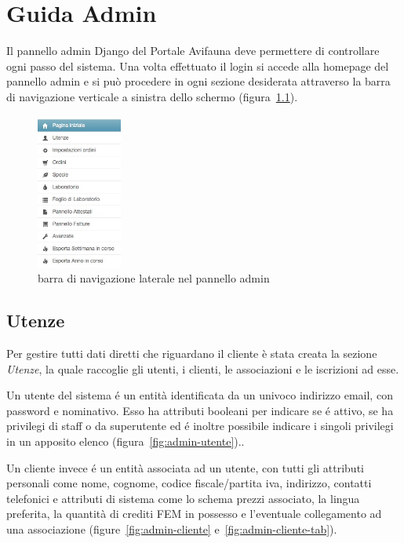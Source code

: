\chapter{Guida Admin}
\label{app:admin}

Il pannello admin Django del Portale Avifauna deve permettere di controllare ogni passo del sistema. Una volta effettuato il login si accede alla homepage del pannello admin e si può procedere in ogni sezione desiderata attraverso la barra di navigazione verticale a sinistra dello schermo (figura~\ref{fig:admin-navbar}).

\begin{figure}
 \centering
 \includegraphics[width=0.25\textwidth]{images/admin-navbar}
 \caption{barra di navigazione laterale nel pannello admin}
 \label{fig:admin-navbar}
\end{figure}

\section*{Utenze}
Per gestire tutti dati diretti che riguardano il cliente è stata creata la sezione \emph{Utenze}, la quale raccoglie gli utenti, i clienti, le associazioni e le iscrizioni ad esse.

Un \textsf{utente} del sistema é un entità identificata da un univoco indirizzo email, con password e nominativo. Esso ha attributi booleani per indicare se é attivo, se ha privilegi di staff o da superutente ed é inoltre possibile indicare i singoli privilegi in un apposito elenco (figura~\ref{fig:admin-utente})..

Un \textsf{cliente} invece é un entità associata ad un utente, con tutti gli attributi personali come nome, cognome, codice fiscale/partita iva, indirizzo, contatti telefonici e attributi di sistema come lo schema prezzi associato, la lingua preferita, la quantità di crediti FEM in possesso e l'eventuale collegamento ad una associazione (figure~\ref{fig:admin-cliente} e~\ref{fig:admin-cliente-tab}).

